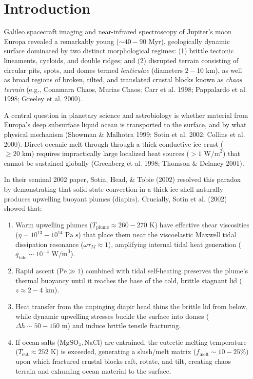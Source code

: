 \documentclass[11pt,a4paper]{article}
\begin{document}
\section{Introduction}
Galileo spacecraft imaging and near-infrared spectroscopy of Jupiter's moon Europa revealed a remarkably young ($\sim 40 - 90\text{ Myr}$), geologically dynamic surface dominated by two distinct morphological regimes: (1) brittle tectonic lineaments, cycloids, and double ridges; and (2) disrupted terrain consisting of circular pits, spots, and domes termed \textit{lenticulae} (diameters $2 - 10\text{ km}$), as well as broad regions of broken, tilted, and translated crustal blocks known as \textit{chaos terrain} (e.g., Conamara Chaos, Murias Chaos; Carr et al. 1998; Pappalardo et al. 1998; Greeley et al. 2000).

A central question in planetary science and astrobiology is whether material from Europa's deep subsurface liquid ocean is transported to the surface, and by what physical mechanism (Showman \& Malhotra 1999; Sotin et al. 2002; Collins et al. 2000). Direct oceanic melt-through through a thick conductive ice crust ($\ge 20\text{ km}$) requires impractically large localized heat sources ($> 1\text{ W/m}^2$) that cannot be sustained globally (Greenberg et al. 1998; Thomson \& Delaney 2001).

In their seminal 2002 paper, Sotin, Head, \& Tobie (2002) resolved this paradox by demonstrating that solid-state convection in a thick ice shell naturally produces upwelling buoyant plumes (diapirs). Crucially, Sotin et al. (2002) showed that:
\begin{enumerate}
    \item Warm upwelling plumes ($T_{\text{plume}} \approx 260 - 270\text{ K}$) have effective shear viscosities ($\eta \sim 10^{13} - 10^{14}\text{ Pa s}$) that place them near the viscoelastic Maxwell tidal dissipation resonance ($\omega \tau_M \approx 1$), amplifying internal tidal heat generation ($q_{\text{tide}} \sim 10^{-4}\text{ W/m}^3$).
    \item Rapid ascent ($\text{Pe} \gg 1$) combined with tidal self-heating preserves the plume's thermal buoyancy until it reaches the base of the cold, brittle stagnant lid ($z \approx 2 - 4\text{ km}$).
    \item Heat transfer from the impinging diapir head thins the brittle lid from below, while dynamic upwelling stresses buckle the surface into domes ($\Delta h \sim 50 - 150\text{ m}$) and induce brittle tensile fracturing.
    \item If ocean salts ($\mathrm{MgSO_4, NaCl}$) are entrained, the eutectic melting temperature ($T_{\text{eut}} \approx 252\text{ K}$) is exceeded, generating a slush/melt matrix ($f_{\text{melt}} \sim 10 - 25\%$) upon which fractured crustal blocks raft, rotate, and tilt, creating chaos terrain and exhuming ocean material to the surface.
\end{enumerate}
\end{document}
